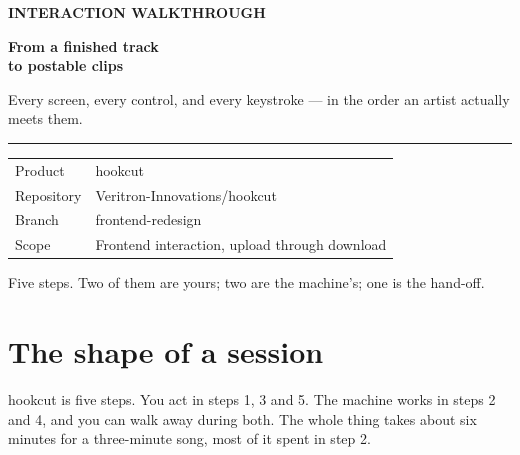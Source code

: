 \documentclass[11pt,a4paper]{article}
\begin{document}
\begin{titlepage}
\vspace*{2.4cm}
{\sffamily\bfseries\footnotesize\color{violet}INTERACTION WALKTHROUGH}\par
\vspace{10pt}

{\sffamily\bfseries\fontsize{36}{40}\selectfont
From a finished track\\
\textcolor{muted}{to postable clips}\par}

\vspace{18pt}
{\large\color{ink2}
Every screen, every control, and every keystroke --- in the order an artist
actually meets them.\par}

\vspace{28pt}
\textcolor{rulec}{\rule{\linewidth}{0.6pt}}
\vspace{12pt}

{\ttfamily\small\color{muted}
\begin{tabular}{@{}ll@{}}
Product   & hookcut \\
Repository & Veritron-Innovations/hookcut \\
Branch    & frontend-redesign \\
Scope     & Frontend interaction, upload through download \\
\end{tabular}\par}

\vfill
{\ttfamily\scriptsize\color{muted}
Five steps. Two of them are yours; two are the machine's; one is the hand-off.\par}
\end{titlepage}

\tableofcontents
\newpage

\section{The shape of a session}

hookcut is five steps. You act in steps 1, 3 and 5. The machine works in
steps 2 and 4, and you can walk away during both. The whole thing takes about
six minutes for a three-minute song, most of it spent in step 2.
\end{document}
